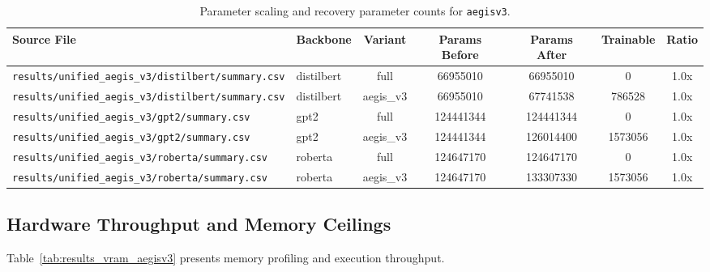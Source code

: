 \begin{table}[t]
\centering
\small
\begin{tabular}{llccccc}
\toprule
\textbf{Source File} & \textbf{Backbone} & \textbf{Variant} & \textbf{Params Before} & \textbf{Params After} & \textbf{Trainable} & \textbf{Ratio} \\
\midrule
\texttt{results/unified\_aegis\_v3/distilbert/summary.csv} & distilbert & full & 66955010 & 66955010 & 0 & 1.0x \\
\texttt{results/unified\_aegis\_v3/distilbert/summary.csv} & distilbert & aegis\_v3 & 66955010 & 67741538 & 786528 & 1.0x \\
\texttt{results/unified\_aegis\_v3/gpt2/summary.csv} & gpt2 & full & 124441344 & 124441344 & 0 & 1.0x \\
\texttt{results/unified\_aegis\_v3/gpt2/summary.csv} & gpt2 & aegis\_v3 & 124441344 & 126014400 & 1573056 & 1.0x \\
\texttt{results/unified\_aegis\_v3/roberta/summary.csv} & roberta & full & 124647170 & 124647170 & 0 & 1.0x \\
\texttt{results/unified\_aegis\_v3/roberta/summary.csv} & roberta & aegis\_v3 & 124647170 & 133307330 & 1573056 & 1.0x \\
\bottomrule
\end{tabular}
\caption{Parameter scaling and recovery parameter counts for \texttt{aegisv3}.}
\label{tab:results_params_aegisv3}
\end{table}

\subsection{Hardware Throughput and Memory Ceilings}
Table~\ref{tab:results_vram_aegisv3} presents memory profiling and execution throughput.

